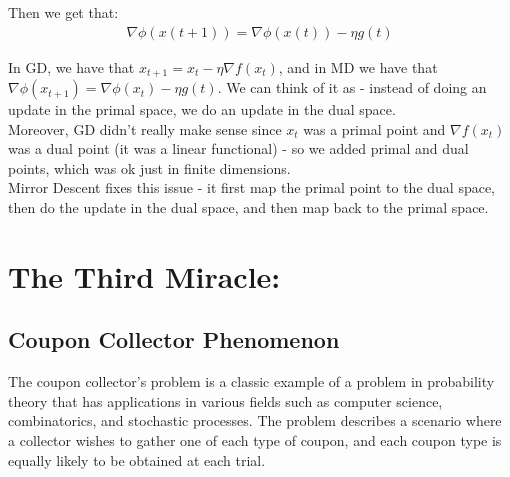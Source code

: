 \documentclass[11pt]{book} %
\begin{document}
Then we get that:
\begin{align*}
    \nabla \phi(x(t+1)) = \nabla \phi(x(t)) - \eta g(t)
\end{align*}

In GD, we have that $x_{t+1} = x_t - \eta \nabla f(x_t)$, and in MD we have that $\nabla \phi(x_{t+1}) = \nabla \phi(x_t) - \eta g(t)$.
We can think of it as - instead of doing an update in the primal space, we do an update in the dual space. \\
Moreover, GD didn't really make sense since $x_t$ was a primal point and $\nabla f(x_t)$ was a dual point (it was a linear functional) - 
so we added primal and dual points, which was ok just in finite dimensions. \\
Mirror Descent fixes this issue - it first map the primal point to the dual space, then do the update in the dual space, and then map back to the primal space.





\chapter{The Third Miracle: }

\section{Coupon Collector Phenomenon}

The coupon collector's problem is a classic example of a problem in probability theory that has applications in various fields such as computer science, 
combinatorics, and stochastic processes. 
The problem describes a scenario where a collector wishes to gather one of each type of coupon, 
and each coupon type is equally likely to be obtained at each trial.
\end{document}

